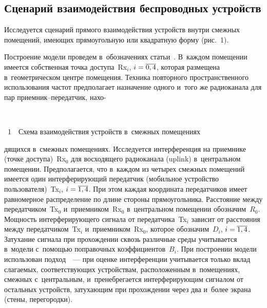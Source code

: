 \begin{multicols}{2}
\section{Сценарий взаимодействия беспроводных устройств}

  Исследуется сценарий прямого взаимодействия устройств внутри смежных 
помещений, имеющих прямоугольную или квадратную форму (рис.~1). 
  

  
  Построение модели проведем в~обозначениях статьи~\cite{12-gai}. 
В~каждом помещении имеется собственная точка доступа~Rx$_i$, 
$i\hm=\overline{0,4}$, которая размещена в~геометрическом центре 
помещения. Техника повторного пространственного использования
 частот 
предполагает назначение одного и~того же радиоканала для пар  
при\-ем\-ник--пе\-ре\-дат\-чик, нахо-\linebreak\vspace*{-12pt}
\noindent
 \begin{center}  %
 \vspace*{12pt}
 \mbox{%
\epsfxsize=75.343mm 
}
\end{center}


\noindent
{{\figurename~1}\ \ \small{Схема взаимодействия устройств в~смежных помещениях}}





\addtocounter{figure}{1}


\noindent
дящихся в~смежных помещениях. 
Исследуется интерференция на приемнике (точке доступа)~Rx$_0$ для 
восходящего радиоканала (uplink) в~центральном помещении. 
Предполагается, что в~каждом из четырех смежных помещений имеется один 
интерферирующий передатчик (мобильное устройство пользователя)~Tx$_i$, 
$i\hm=\overline{1,4}$. При этом каждая координата передатчиков имеет 
равномерное распределение по длине стороны прямоугольника. Расстояние 
между передатчиком~Tx$_0$ и~приемником~Rx$_0$ в~центральном 
помещении обозначим~$R_0$. Мощность интерферирующего сигнала от 
передатчика~Tx$_i$ зависит от расстояния между передатчиком~Tx$_i$ 
и~приемником~Rx$_0$, которое обозначим~$D_i$, $i\hm=\overline{1,4}$. 
Затухание сигнала при прохождении сквозь различные среды учитывается 
в~модели с~помощью поправочных коэффициентов~$B_i$. При построении 
модели использован подход~\cite{13-gai}~--- при оценке интерференции 
учитывается только вклад слагаемых, соответствующих устройствам, 
расположенным в~помещениях, смежных с~центральным, и~пренебрегается 
интерферирующим сигналом от остальных устройств, затухающим при 
прохождении через два и~более экрана (стены, перегородки). 


\end{multicols}
